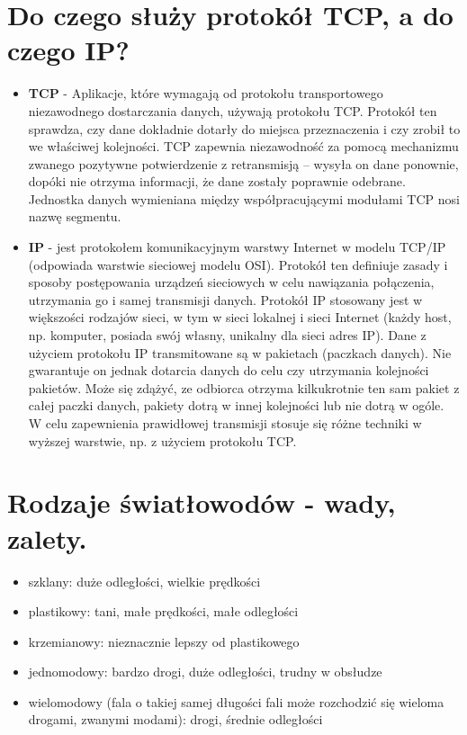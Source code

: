 \documentclass[12pt,a4paper]{article}
\begin{document}
	\section{Do czego służy protokół TCP, a do czego IP?}
	\begin{itemize}
		\item \textbf{TCP} - Aplikacje, które wymagają od protokołu transportowego niezawodnego dostarczania danych, używają protokołu TCP. Protokół ten sprawdza, czy dane dokładnie dotarły do miejsca przeznaczenia i czy zrobił to we właściwej kolejności. TCP zapewnia niezawodność za pomocą mechanizmu zwanego pozytywne potwierdzenie z retransmisją – wysyła on dane ponownie, dopóki nie otrzyma informacji, że dane zostały poprawnie odebrane. Jednostka danych wymieniana między współpracującymi modułami TCP nosi nazwę segmentu.
		\item \textbf{IP} - jest protokołem komunikacyjnym warstwy Internet w modelu TCP/IP (odpowiada warstwie sieciowej modelu OSI). Protokół ten definiuje zasady i sposoby postępowania urządzeń sieciowych w celu nawiązania połączenia, utrzymania go i samej transmisji danych. Protokół IP stosowany jest w większości rodzajów sieci, w tym w sieci lokalnej i sieci Internet (każdy host, np. komputer, posiada swój własny, unikalny dla sieci adres IP). Dane z użyciem protokołu IP transmitowane są w pakietach (paczkach danych). Nie gwarantuje on jednak dotarcia danych do celu czy utrzymania kolejności pakietów. Może się zdążyć, ze odbiorca otrzyma kilkukrotnie ten sam pakiet z całej paczki danych, pakiety dotrą w innej kolejności lub nie dotrą w ogóle. W celu zapewnienia prawidłowej transmisji stosuje się różne techniki w wyższej warstwie, np. z użyciem protokołu TCP.
	\end{itemize}

	\section{Rodzaje światłowodów - wady, zalety.}
	\begin{itemize}
		\item szklany: duże odległości, wielkie prędkości
		\item plastikowy: tani, małe prędkości, małe odległości
		\item krzemianowy: nieznacznie lepszy od plastikowego
		\item jednomodowy: bardzo drogi, duże odległości, trudny w obsłudze
		\item wielomodowy (fala o takiej samej długości fali może rozchodzić się wieloma drogami, zwanymi modami): drogi, średnie odległości
	\end{itemize}
\end{document}
